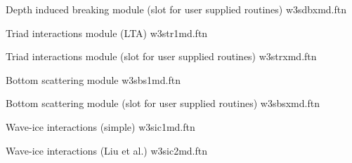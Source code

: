 \begin{flisti}
\end{flisti}

\noindent
Depth induced breaking module (slot for user supplied routines) \hfill {\file
w3sdbxmd.ftn}

\begin{flisti}
\end{flisti}

\noindent
Triad interactions module (LTA) \hfill {\file w3str1md.ftn}

\begin{flisti}
\end{flisti}

\noindent
Triad interactions module (slot for user supplied routines) \hfill {\file
w3strxmd.ftn}

\begin{flisti}
\end{flisti}

\noindent
Bottom scattering module \hfill {\file w3sbs1md.ftn}

\begin{flisti}
\end{flisti}

\noindent
Bottom scattering module (slot for user supplied routines) \hfill {\file
w3sbsxmd.ftn}

\begin{flisti}
\end{flisti}

\pb \noindent
Wave-ice interactions (simple) \hfill {\file w3sic1md.ftn}

\begin{flisti}
\end{flisti}

\noindent
Wave-ice interactions (Liu et al.) \hfill {\file w3sic2md.ftn}

\begin{flisti}
\end{flisti}

